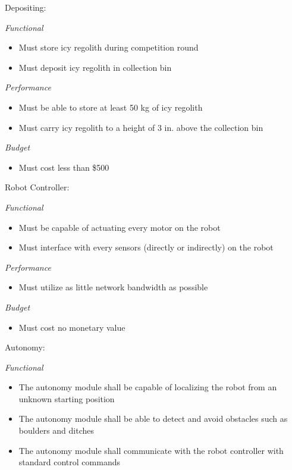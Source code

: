 \documentclass[class=article, crop=false]{standalone}
\begin{document}
\vspace*{0.1in}

\noindent
\normalsize 
Depositing:
\footnotesize

\vspace*{0.05in}
\noindent
\emph{Functional}
\begin{itemize}
 \item Must store icy regolith during competition round
 \item Must deposit icy regolith in collection bin
\end{itemize}
\noindent
\emph{Performance}
\begin{itemize}
 \item Must be able to store at least 50 kg of icy regolith
 \item Must carry icy regolith to a height of 3 in. above the collection bin
\end{itemize}
\noindent
\emph{Budget}
\begin{itemize}
 \item Must cost less than \$500
\end{itemize}


\vspace*{0.1in}

\noindent
\normalsize
Robot Controller:
\footnotesize

\vspace*{0.05in}
\noindent
\emph{Functional}
\begin{itemize}
 \item Must be capable of actuating every motor on the robot
 \item Must interface with every sensors (directly or indirectly) on the robot
\end{itemize}
\emph{Performance}
\begin{itemize}
 \item Must utilize as little network bandwidth as possible
\end{itemize}
\newpage\noindent
\emph{Budget}
\begin{itemize}
 \item Must cost no monetary value
\end{itemize}

\vspace*{0.1in}

\noindent
\normalsize
Autonomy:
\footnotesize
\vspace*{0.05in}

\noindent
\emph{Functional}
\begin{itemize}
 \item The autonomy module shall be capable of localizing the robot from an unknown starting position
 \item The autonomy module shall be able to detect and avoid obstacles such as boulders and ditches
 \item The autonomy module shall communicate with the robot controller with standard control commands
\end{itemize}
\end{document}
